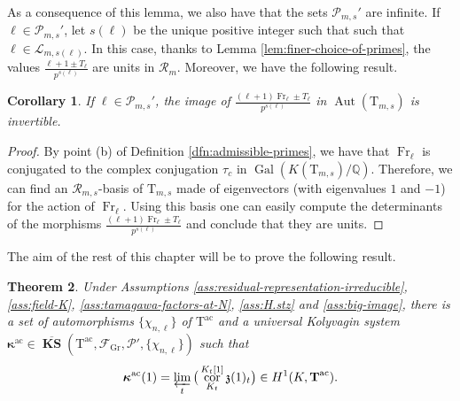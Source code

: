 \documentclass[12pt,reqno]{amsart}
\newtheorem{theorem}{Theorem}[section]
\newtheorem{corollary}[theorem]{Corollary}
\theoremstyle{definition}
\theoremstyle{remark}
\newcommand{\numberset}{\mathbb}
\newcommand{\Q}{\numberset{Q}}
\newcommand{\T}{\boldsymbol{\mathrm{T}}}
\newcommand{\calR}{\mathcal{R}}
\DeclareMathOperator{\Gal}{Gal}
\DeclareMathOperator{\Aut}{Aut}
\DeclareMathOperator{\Cor}{cor}
\DeclareMathOperator{\Fr}{Fr}
\DeclareMathOperator{\ks}{KS}
\newcommand{\KS}{\boldsymbol{\ks}}
\newcommand{\ac}{\mathrm{ac}}
\newcommand{\Gr}{\mathrm{Gr}}
\newcommand{\gk}{\kappa}
\begin{document}
As a consequence of this lemma, we also have that the sets $\mathcal{P}_{m,s}'$ are infinite. If $\ell\in\mathcal{P}_{m,s}'$, let $s(\ell)$ be the unique positive integer such that such that $\ell\in \mathcal{L}_{m,s(\ell)}$. In this case, thanks to Lemma \ref{lem:finer-choice-of-primes}, the values $\frac{\ell+1\pm T_\ell}{p^{s(\ell)}}$ are units in $\mathcal{R}_m$. Moreover, we have the following result.

\begin{corollary}\label{cor:finer-choice-of-primes}
    If $\ell\in\mathcal{P}_{m,s}'$, the image of $\frac{(\ell+1)\Fr_\ell\pm T_\ell}{p^{s(\ell)}}$ in $\Aut(\T_{m,s})$ is invertible.
\end{corollary}
\begin{proof}
    By point (b) of Definition \ref{dfn:admissible-primes}, we have that $\Fr_\ell$ is conjugated to the complex conjugation $\tau_c$ in $\Gal(K(\T_{m,s})/\Q)$. Therefore, we can find an $\calR_{m,s}$-basis of $\T_{m,s}$ made of eigenvectors (with eigenvalues $1$ and $-1$) for the action of $\Fr_\ell$. Using this basis one can easily compute the determinants of the morphisms $\frac{(\ell+1)\Fr_\ell\pm T_\ell}{p^{s(\ell)}}$ and conclude that they are units.
\end{proof}



The aim of the rest of this chapter will be to prove the following result.

\begin{theorem}\label{thm:main-thm}
    Under Assumptions \ref{ass:residual-representation-irreducible}, \ref{ass:field-K}, \ref{ass:tamagawa-factors-at-N}, \ref{ass:H.stz} and \ref{ass:big-image}, there is a set of automorphisms $\{\chi_{n,\ell}\}$ of $\T^{\ac}$ and a universal Kolyvagin system $\boldsymbol{\gk}^{\ac}\in\overline{\KS}(\T^{\ac},\mathcal{F}_{\Gr},\mathcal{P}',\{\chi_{n,\ell}\})$ such that
    \begin{equation*}
        \boldsymbol{\gk}^{\ac}(1)=\varprojlim_t\big(\Cor^{K_t[1]}_{K_t}\mathfrak{z}(1)_{t}\big)\in H^1(K,\T^{\ac}).
    \end{equation*}
\end{theorem}
\end{document}

